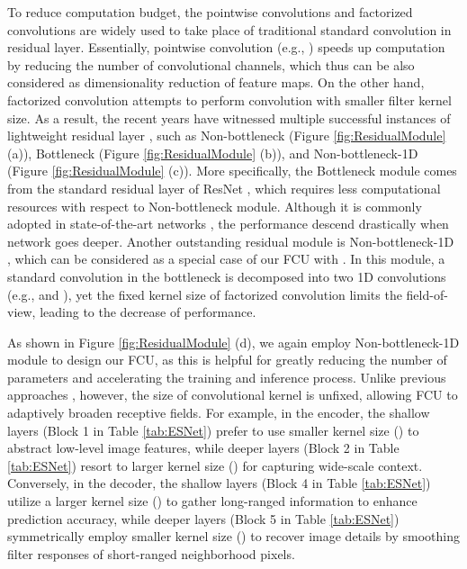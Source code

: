 \documentclass[runningheads]{llncs}
\begin{document}
To reduce computation budget, the pointwise convolutions \cite{Paszke2016enet,zhang2018shuffle,xie2017agg} and factorized convolutions \cite{Romera2018erfnet,fast2019zhang} are widely used to take place of traditional standard convolution in residual layer. Essentially, pointwise convolution (e.g., ) speeds up computation by reducing the number of convolutional channels, which thus can be also considered as dimensionality reduction of feature maps. On the other hand, factorized convolution attempts to perform convolution with smaller filter kernel size. As a result, the recent years have witnessed multiple successful instances of lightweight residual layer \cite{Paszke2016enet,Howard2017mobile}, such as Non-bottleneck (Figure \ref{fig:ResidualModule} (a)), Bottleneck (Figure \ref{fig:ResidualModule} (b)), and Non-bottleneck-1D (Figure \ref{fig:ResidualModule} (c)). More specifically, the Bottleneck module comes from the standard residual layer of ResNet \cite{he2016deep}, which requires less computational resources with respect to Non-bottleneck module. Although it is commonly adopted in state-of-the-art networks \cite{Paszke2016enet,Mehta2018espnet,Howard2017mobile}, the performance descend drastically when network goes deeper. Another outstanding residual module is Non-bottleneck-1D \cite{Romera2018erfnet}, which can be considered as a special case of our FCU with . In this module, a standard  convolution in the bottleneck is decomposed into two 1D convolutions (e.g.,  and ), yet the fixed kernel size of factorized convolution limits the field-of-view, leading to the decrease of performance.

As shown in Figure \ref{fig:ResidualModule} (d), we again employ Non-bottleneck-1D module \cite{Romera2018erfnet,fast2019zhang} to design our FCU, as this is helpful for greatly reducing the number of parameters and accelerating the training and inference process. Unlike previous approaches \cite{Romera2018erfnet,fast2019zhang}, however, the size of convolutional kernel is unfixed, allowing FCU to adaptively broaden receptive fields. For example, in the encoder, the shallow layers (Block 1 in Table \ref{tab:ESNet}) prefer to use smaller kernel size () to abstract low-level image features, while deeper layers (Block 2 in Table \ref{tab:ESNet}) resort to larger kernel size () for capturing wide-scale context. Conversely, in the decoder, the shallow layers (Block 4 in Table \ref{tab:ESNet}) utilize a larger kernel size () to gather long-ranged information to enhance prediction accuracy, while deeper layers (Block 5 in Table \ref{tab:ESNet}) symmetrically employ smaller kernel size () to recover image details by smoothing filter responses of short-ranged neighborhood pixels.
\end{document}
